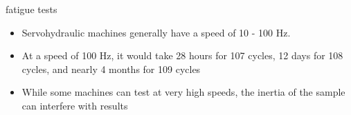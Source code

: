 \documentclass[
  letterpaper,
  ignorenonframetext,
  aspectratio=43,
  handout,
  12pt]{beamer}
\providecommand{\tightlist}{%
  \setlength{\itemsep}{0pt}\setlength{\parskip}{0pt}}
\providecommand{\tightlist}{%
\setlength{\itemsep}{0pt}\setlength{\parskip}{0pt}}
\begin{document}
\begin{frame}{fatigue tests}
\protect\hypertarget{fatigue-tests-3}{}
\begin{itemize}
\tightlist
\item
  Servohydraulic machines generally have a speed of 10 - 100 Hz.
\item
  At a speed of 100 Hz, it would take 28 hours for 107 cycles, 12 days
  for 108 cycles, and nearly 4 months for 109 cycles
\item
  While some machines can test at very high speeds, the inertia of the
  sample can interfere with results
\end{itemize}
\end{frame}
\end{document}
